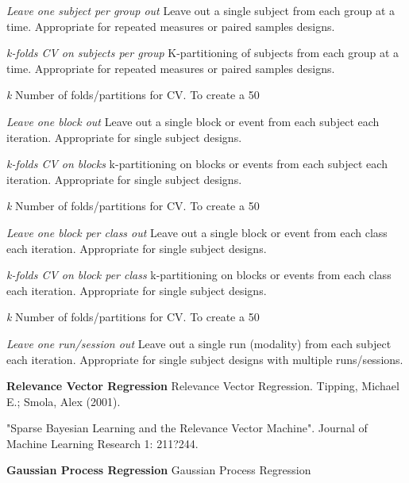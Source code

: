 \textit{Leave one subject per group out}
Leave out a single subject from each group at a time. Appropriate for repeated measures or paired samples designs.


\textit{k-folds CV on subjects per group}
K-partitioning of subjects from each group at a time. Appropriate for repeated measures or paired samples designs.


\textit{k}
Number of folds/partitions for CV. To create a 50%


\textit{Leave one block out}
Leave out a single block or event from each subject each iteration. Appropriate for single subject designs.


\textit{k-folds CV on blocks}
k-partitioning on blocks or events from each subject each iteration. Appropriate for single subject designs.


\textit{k}
Number of folds/partitions for CV. To create a 50%


\textit{Leave one block per class out}
Leave out a single block or event from each class each iteration. Appropriate for single subject designs.


\textit{k-folds CV on block per class}
k-partitioning on blocks or events from each class each iteration. Appropriate for single subject designs.


\textit{k}
Number of folds/partitions for CV. To create a 50%


\textit{Leave one run/session out}
Leave out a single run (modality) from each subject each iteration. Appropriate for single subject designs with multiple runs/sessions.


\textbf{Relevance Vector Regression}
Relevance Vector Regression. Tipping, Michael E.; Smola, Alex (2001).

"Sparse Bayesian Learning and the Relevance Vector Machine". Journal of Machine Learning Research 1: 211?244.


\textbf{Gaussian Process Regression}
Gaussian Process Regression


